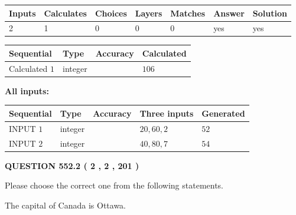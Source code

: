 \documentclass[12pt]{article}
\begin{document}
 

 
   
   
   
   
\noindent\begin{tabular}{|l|l|l|l|l|l|l|}
 \hline
Inputs & Calculates & Choices & Layers & Matches & Answer & Solution \\ \hline
 2  & 
 1  & 
 0
  & 
 0  & 
 0  & 
  yes & 
  yes 
  \\ \hline
 \end{tabular}
   
   
   
   
\noindent{}
   
   
  
  
\noindent\begin{tabular}{|l|l|l|l|}
\hline
 Sequential & Type & Accuracy & Calculated \\ 
\hline
 
 
  Calculated $  1 $ & integer &  & 
  $ 106 $ 
 \\  \hline  
 \end{tabular}
   
   
   
   
\noindent\vspace{0.1in}\hspace{-0.08in} {\textbf{\Large{All inputs: }}}
   
   
  
  
\noindent\begin{tabular}{|l|l|l|l|l|}
\hline
 Sequential & Type & Accuracy & Three inputs & Generated \\ 
\hline
 
 
  INPUT $  1 $ & integer &  & $
 20
 , 
 60
 , 
 2
 $ & $ 52 $ 
 \\  \hline  
 
 
  INPUT $  2 $ & integer &  & $
 40
 , 
 80
 , 
 7
 $ & $ 54 $ 
 \\  \hline  
 \end{tabular}
   
   
  
\vspace{0.2in}
  
{\textbf{\Large{QUESTION
552.2 
 ( 2 , 2 , 201 )
}}}
  
  
Please choose the correct one from the following statements.
 
 
The capital of Canada is Ottawa.
 
\end{document}
